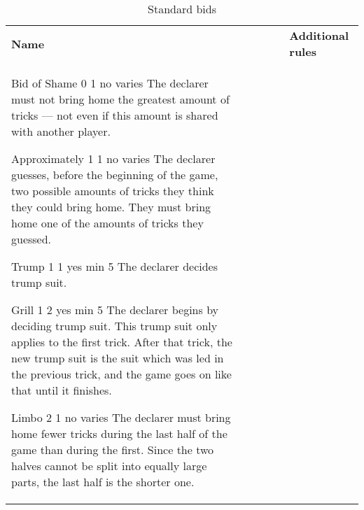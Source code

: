 %
%
%
%
%

\begin{table}
	\caption{Standard bids}\label{tab:standardBids}
	\begin{center}
		\begin{tabularx}{\textwidth}{
			l
			S[table-number-alignment=center, table-format=1.0]
			S[table-number-alignment=center, table-format=1.0]
			cc|X
		}
				\textbf{Name} &
				 &
				 &
				 &
				 &
				\textbf{Additional rules}
				\\[-3ex]

				\standardBidItem%
				{Bid of Shame}
				{0}
				{1}
				{no}
				{varies}
				{%
					The declarer must not bring home the greatest amount of tricks --- not even if this amount is shared with another player.
				}

				\standardBidItem%
				{Approximately}
				{1}
				{1}
				{no}
				{varies}
				{%
					The declarer guesses, before the beginning of the game, two possible amounts of tricks they think they could bring home. They must bring home one of the amounts of tricks they guessed.
				}

				\standardBidItem%
				{Trump}
				{1}
				{1}
				{yes}
				{min 5}
				{%
					The declarer decides trump suit.
				}

				\standardBidItem%
				{Grill}
				{1}
				{2}
				{yes}
				{min 5}
				{%
					The declarer begins by deciding trump suit. This trump suit only applies to the first trick. After that trick, the new trump suit is the suit which was led in the previous trick, and the game goes on like that until it finishes.
				}

				\standardBidItem%
				{Limbo}
				{2}
				{1}
				{no}
				{varies}
				{%
					The declarer must bring home fewer tricks during the last half of the game than during the first. Since the two halves cannot be split into equally large parts, the last half is the shorter one.
				}
				

\end{tabularx}
\end{center}
\end{table}
